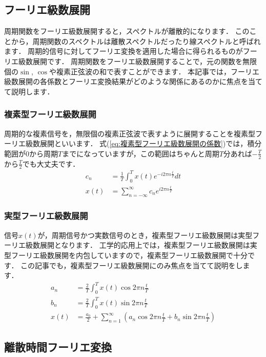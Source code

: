 \subsection{フーリエ級数展開}

周期関数をフーリエ級数展開すると，スペクトルが離散的になります．
このことから，周期関数のスペクトルは離散スペクトルだったり線スペクトルと呼ばれます．
周期的信号に対してフーリエ変換を適用した場合に得られるものがフーリエ級数展開です．
周期関数をフーリエ級数展開することで，元の関数を無限個の$\sin$, $\cos$や複素正弦波の和で表すことができます．
本記事では，フーリエ級数展開の各係数とフーリエ変換結果がどのような関係にあるのかに焦点を当てて説明します．

\subsubsection{複素型フーリエ級数展開}

周期的な複素信号を，無限個の複素正弦波で表すように展開することを複素型フーリエ級数展開といいます．
式(\ref{eq:複素型フーリエ級数展開の係数})では，積分範囲が$0$から周期$T$までになっていますが，この範囲はちゃんと周期$T$分あれば$-\frac{T}{2}$から$\frac{T}{2}$でも大丈夫です．
\begin{align}
c_n &= \frac{1}{T} \int_{0}^{T} x(t) e^{-i2\pi n \frac{t}{T}} dt \label{eq:複素型フーリエ級数展開の係数}\\
x(t) &= \sum_{n=-\infty}^{\infty} c_n e^{i2\pi n \frac{t}{T}}
\end{align}


\subsubsection{実型フーリエ級数展開}

信号$x(t)$が，周期信号かつ実数信号のとき，複素型フーリエ級数展開は実型フーリエ級数展開となります．
工学的応用上では，複素型フーリエ級数展開は実型フーリエ級数展開を内包していますので，複素型フーリエ級数展開で十分です．
この記事でも，複素型フーリエ級数展開にのみ焦点を当てて説明をします．
\begin{align}
a_n &= \frac{2}{T} \int_0^T x(t) \cos {2\pi n \frac{t}{T}} \\
b_n &= \frac{2}{T} \int_0^T x(t) \sin {2\pi n \frac{t}{T}} \\
x(t) &= \frac{a_0}{2} + \sum_{n=1}^{\infty}\left(a_n \cos {2\pi n \frac{t}{T}} + b_n \sin {2\pi n \frac{t}{T}} \right)
\end{align}


\subsection{離散時間フーリエ変換}

